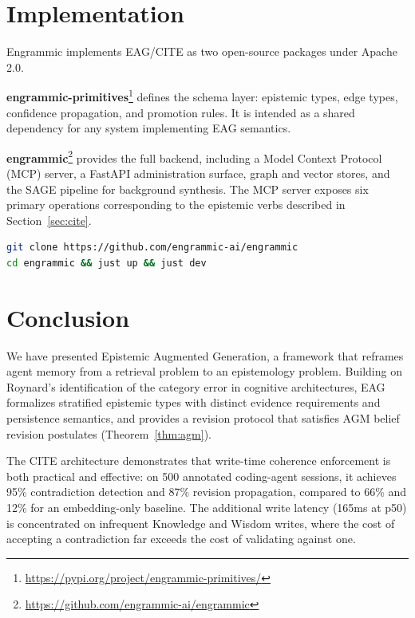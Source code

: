 \documentclass[11pt,letterpaper]{article}
\begin{document}
\section{Implementation}

Engrammic implements EAG/CITE as two open-source packages under Apache 2.0.

\textbf{engrammic-primitives}\footnote{\url{https://pypi.org/project/engrammic-primitives/}} defines the schema layer: epistemic types, edge types, confidence propagation, and promotion rules. It is intended as a shared dependency for any system implementing EAG semantics.

\textbf{engrammic}\footnote{\url{https://github.com/engrammic-ai/engrammic}} provides the full backend, including a Model Context Protocol (MCP) server, a FastAPI administration surface, graph and vector stores, and the SAGE pipeline for background synthesis. The MCP server exposes six primary operations corresponding to the epistemic verbs described in Section~\ref{sec:cite}.

\begin{lstlisting}[language=bash]
git clone https://github.com/engrammic-ai/engrammic
cd engrammic && just up && just dev
\end{lstlisting}

\section{Conclusion}

We have presented Epistemic Augmented Generation, a framework that reframes agent memory from a retrieval problem to an epistemology problem. Building on Roynard's identification of the category error in cognitive architectures, EAG formalizes stratified epistemic types with distinct evidence requirements and persistence semantics, and provides a revision protocol that satisfies AGM belief revision postulates (Theorem~\ref{thm:agm}).

The CITE architecture demonstrates that write-time coherence enforcement is both practical and effective: on 500 annotated coding-agent sessions, it achieves 95\% contradiction detection and 87\% revision propagation, compared to 66\% and 12\% for an embedding-only baseline. The additional write latency (165ms at p50) is concentrated on infrequent Knowledge and Wisdom writes, where the cost of accepting a contradiction far exceeds the cost of validating against one.
\end{document}
